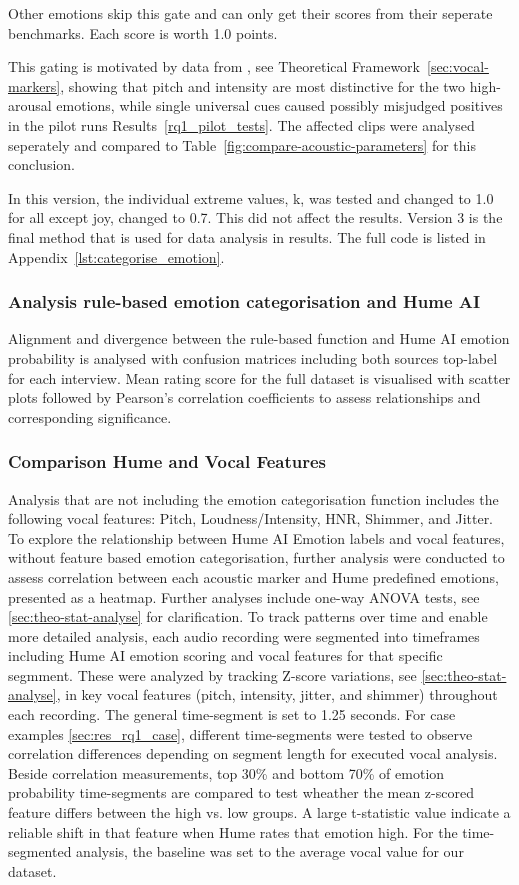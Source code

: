 Other emotions skip this gate and can only get their scores from their seperate benchmarks. Each score is worth 1.0 points. 

This gating is motivated by data from \textcite{Ekberg2023}, see Theoretical Framework~\ref{sec:vocal-markers}, showing that pitch and intensity are most distinctive for 
the two high-arousal emotions, while single universal cues caused possibly misjudged positives in the pilot runs Results~\ref{rq1_pilot_tests}. The affected clips were analysed seperately and compared to Table~\ref{fig:compare-acoustic-parameters} for this conclusion. 

In this version, the individual extreme values, k, was tested and changed to 1.0 for all except joy, changed to 0.7. This did not affect the results. 
Version 3 is the final method that is used for data analysis in results. The full code is listed in Appendix~\ref{lst:categorise_emotion}.

\subsubsection{Analysis rule-based emotion categorisation and Hume AI}
Alignment and divergence between the rule-based function and Hume AI emotion probability is analysed with confusion matrices including both sources top-label for each interview. 
Mean rating score for the full dataset is visualised with scatter plots followed by Pearson's correlation coefficients to assess relationships and corresponding significance. 

\subsubsection{Comparison Hume and Vocal Features}
Analysis that are not including the emotion categorisation function includes the following vocal features: Pitch, Loudness/Intensity, HNR, Shimmer, and Jitter. To explore the relationship between Hume AI Emotion labels and vocal features, without feature based emotion categorisation, further analysis were conducted to assess correlation between each acoustic marker and Hume predefined emotions, presented as a heatmap.
Further analyses include one-way ANOVA tests, see \ref{sec:theo-stat-analyse} for clarification. 
To track patterns over time and enable more detailed analysis, each audio recording were segmented into timeframes including Hume AI emotion scoring and vocal features for that specific segmment. These were analyzed by tracking Z-score variations, see \ref{sec:theo-stat-analyse}, in key vocal features (pitch, intensity, jitter, and shimmer) throughout each recording.
The general time-segment is set to 1.25 seconds. For case examples \ref{sec:res_rq1_case}, different time-segments were tested to observe correlation differences depending on segment length for executed vocal analysis. 
Beside correlation measurements, top 30\% and bottom 70\% of emotion probability time-segments are compared to test wheather the mean z-scored feature differs between the high vs. low groups. 
A large t-statistic value indicate a reliable shift in that feature when Hume rates that emotion high. For the time-segmented analysis, the baseline was set to the average vocal value for our dataset. 

